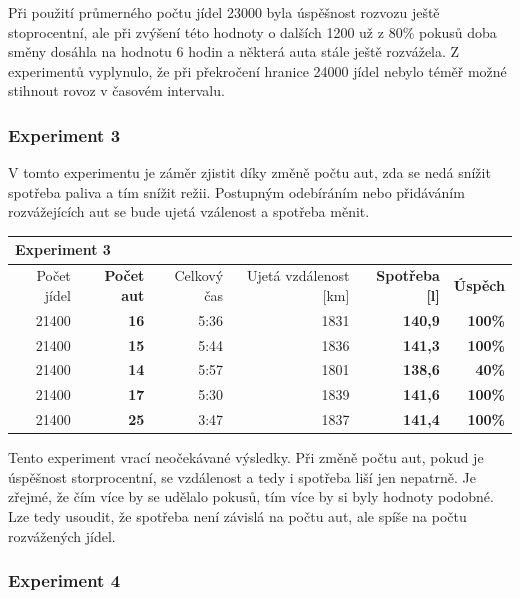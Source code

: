 \documentclass[a4paper, 11pt]{article}
\begin{document}
	Při použití průmerného počtu jídel 23000 byla úspěšnost rozvozu ještě
	stoprocentní, ale při zvýšení této hodnoty o dalších 1200 už z 80\%
	pokusů doba směny dosáhla na hodnotu 6 hodin a některá auta stále ještě
	rozvážela. Z experimentů vyplynulo, že při překročení hranice 24000 jídel
	nebylo téměř možné stihnout rovoz v časovém intervalu.

	\subsubsection{Experiment 3}

	V tomto experimentu je záměr zjistit díky změně počtu aut, zda se nedá
	snížit spotřeba paliva a tím snížit režii. Postupným odebíráním nebo
	přidáváním rozvážejících aut se bude ujetá vzálenost a spotřeba měnit.

	\begin{table}[h!]
		\centering
		\begin{tabular}{|r|r|r|r|r|r|}
			\hline
			\multicolumn{6}{|l|}{\textbf{Experiment 3}}   \\ \hline
			 Počet jídel & \textbf{Počet aut} & Celkový čas & Ujetá vzdálenost [km] & \textbf{Spotřeba [l]} & \textbf{Úspěch} \\ \hline
			 21400 & \textbf{16} & 5:36 & 1831 & \textbf{140,9} & \textbf{100\%} \\ \hline
			 21400 & \textbf{15} & 5:44 & 1836 & \textbf{141,3} & \textbf{100\%} \\ \hline
			 21400 & \textbf{14} & 5:57 & 1801 & \textbf{138,6} & \textbf{40\%}  \\ \hline
			 21400 & \textbf{17} & 5:30 & 1839 & \textbf{141,6} & \textbf{100\%} \\ \hline
			 21400 & \textbf{25} & 3:47 & 1837 & \textbf{141,4} & \textbf{100\%} \\ \hline
		\end{tabular}
	\end{table}

	Tento experiment vrací neočekávané výsledky. Při změně počtu aut, pokud je
	úspěšnost storprocentní, se vzdálenost a tedy i spotřeba liší jen nepatrně.
	Je zřejmé, že čím více by se udělalo pokusů, tím více by si byly hodnoty podobné.
	Lze tedy usoudit, že spotřeba není závislá na počtu aut, ale spíše na počtu
	rozvážených jídel.

	\subsubsection{Experiment 4}
\end{document}
